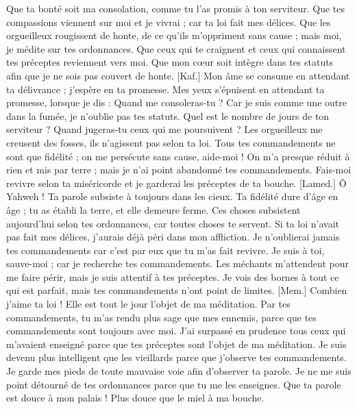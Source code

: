 \begin{multicols}{2}
Que ta bonté soit ma consolation, comme tu l'as promis à ton serviteur.
Que tes compassions viennent sur moi et je vivrai ; car ta loi fait mes délices.
Que les orgueilleux rougissent de honte, de ce qu'ils m'oppriment sans cause ; mais moi, je médite sur tes ordonnances.
Que ceux qui te craignent et ceux qui connaissent tes préceptes reviennent vers moi.
Que mon cœur soit intègre dans tes statuts afin que je ne sois pas couvert de honte.
[Kaf.] Mon âme se consume en attendant ta délivrance ; j'espère en ta promesse.
Mes yeux s'épuisent en attendant ta promesse, lorsque je dis : Quand me consoleras-tu ?
Car je suis comme une outre dans la fumée, je n'oublie pas tes statuts.
Quel est le nombre de jours de ton serviteur ? Quand jugeras-tu ceux qui me poursuivent ?
Les orgueilleux me creusent des fosses, ils n'agissent pas selon ta loi.
Tous tes commandements ne sont que fidélité ; on me persécute sans cause, aide-moi !
On m'a presque réduit à rien et mis par terre ; mais je n'ai point abandonné tes commandements.
Fais-moi revivre selon ta miséricorde et je garderai les préceptes de ta bouche.
[Lamed.] Ô Yahweh ! Ta parole subsiste à toujours dans les cieux.
Ta fidélité dure d'âge en âge ; tu as établi la terre, et elle demeure ferme.
Ces choses subsistent aujourd'hui selon tes ordonnances, car toutes choses te servent.
Si ta loi n'avait pas fait mes délices, j'aurais déjà péri dans mon affliction.
Je n'oublierai jamais tes commandements car c'est par eux que tu m'as fait revivre.
Je suis à toi, sauve-moi ; car je recherche tes commandements.
Les méchants m'attendent pour me faire périr, mais je suis attentif à tes préceptes.
Je vois des bornes à tout ce qui est parfait, mais tes commandements n'ont point de limites.
[Mem.] Combien j'aime ta loi ! Elle est tout le jour l'objet de ma méditation.
Par tes commandements, tu m'as rendu plus sage que mes ennemis, parce que tes commandements sont toujours avec moi.
J'ai surpassé en prudence tous ceux qui m'avaient enseigné parce que tes préceptes sont l'objet de ma méditation.
Je suis devenu plus intelligent que les vieillards parce que j'observe tes commandements.
Je garde mes pieds de toute mauvaise voie afin d'observer ta parole.
Je ne me suis point détourné de tes ordonnances parce que tu me les enseignes.
Que ta parole est douce à mon palais ! Plus douce que le miel à ma bouche.

\end{multicols}
